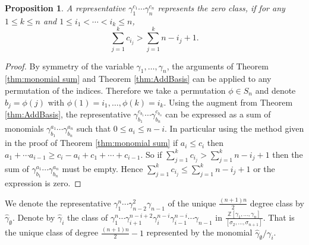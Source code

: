 \documentclass{article}
\theoremstyle{plain}
\newtheorem{prop}[thm]{Proposition}
\theoremstyle{definition}
\numberwithin{thm}{section}
\begin{document}
			\begin{prop}\label{prop:zeros}
				A representative $\gamma_1^{c_1}\cdots\gamma_{n}^{c_n}$ represents the zero class, if for any $1\leq k \leq n$ and $1\leq i_1 < \cdots < i_k \leq n$, 
				\begin{equation*}
					\sum_{j=1}^{k}{c_{i_j}}>\sum_{j=1}^{k}{n-i_j+1}.
				\end{equation*}
			\end{prop}
			\begin{proof}
				By symmetry of the variable $\gamma_1,\dots,\gamma_n$, the arguments of Theorem \ref{thm:monomial sum} and Theorem \ref{thm:AddBasis}
				can be applied to any permutation of the indices.
				Therefore we take a permutation $\phi\in S_n$ and denote $b_j=\phi(j)$ with $\phi(1)=i_1,\dots,\phi(k)=i_k$.
				Using the augment from Theorem \ref{thm:AddBasis}, the representative $\gamma_{b_1}^{c_{b_1}}\cdots\gamma_{b_n}^{c_{b_n}}$
				can be expressed as a sum of monomials 
				$\gamma_{b_1}^{a_1}\cdots \gamma_{b_{n}}^{a_{n}}$ such that $0\leq a_i \leq n-i$.
				In particular using the method given in the proof of Theorem \ref{thm:monomial sum} if $a_i\leq c_i$ then $a_1+\cdots a_{i-1}\geq c_i-a_i+c_1+\cdots+c_{i-1}$.
				So if $\sum_{j=1}^{k}{c_{i_j}}>\sum_{j=1}^{k}{n-i_j+1}$ then the sum of $\gamma_{b_1}^{a_1}\cdots \gamma_{b_{n}}^{a_{n}}$ must be empty.
				Hence $\sum_{j=1}^{k}{c_{i_j}}\leq\sum_{j=1}^{k}{n-i_j+1}$ or the expression is zero.
			\end{proof}
			
			We denote the representative ${\gamma}_1^{n} \cdots {\gamma}_{n-2}^{2}{\gamma}_{n-1}$
			of the unique $\frac{(n+1)n}{2}$ degree class by $\hat{\gamma}_{\emptyset}$.
			Denote by $\hat{\gamma}_{i}$ the class of ${\gamma}_1^{n}\cdots \gamma_{i+1}^{n-i+2} \gamma_{i}^{n-i} \gamma_{i-1}^{n-i} \cdots {\gamma}_{n-1}$
			in $\frac{\mathbb{Z}[\gamma_1,\dots,\gamma_{n}]}{[\sigma_2,\dots,\sigma_{n+1}]}$.
			That is the unique class of degree $\frac{(n+1)n}{2}-1$ represented by the monomial $\hat{\gamma}_{\emptyset}/\gamma_i$.
			
\end{document}
